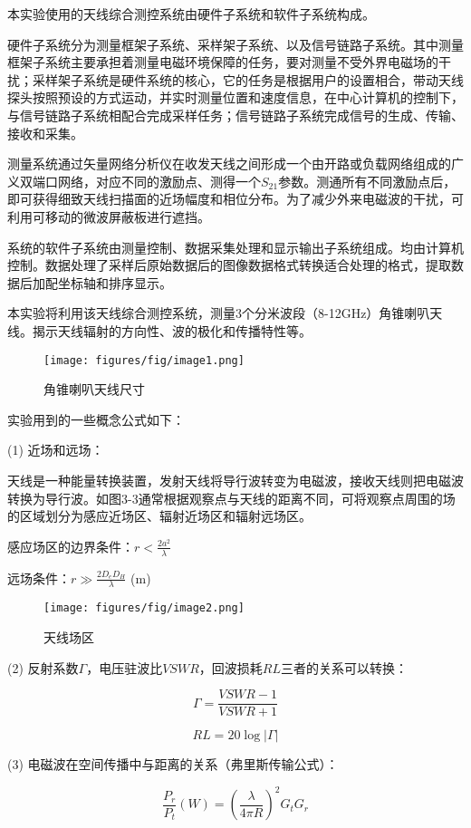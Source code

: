 \documentclass[12pt,hyperref,a4paper,UTF8]{ctexart}
\begin{document}
本实验使用的天线综合测控系统由硬件子系统和软件子系统构成。 

硬件子系统分为测量框架子系统、采样架子系统、以及信号链路子系统。其中测量框架子系统主要承担着测量电磁环境保障的任务，要对测量不受外界电磁场的干扰；采样架子系统是硬件系统的核心，它的任务是根据用户的设置相合，带动天线探头按照预设的方式运动，并实时测量位置和速度信息，在中心计算机的控制下，与信号链路子系统相配合完成采样任务；信号链路子系统完成信号的生成、传输、接收和采集。

测量系统通过矢量网络分析仪在收发天线之间形成一个由开路或负载网络组成的广义双端口网络，对应不同的激励点、测得一个$S_{21}$参数。测通所有不同激励点后，即可获得细致天线扫描面的近场幅度和相位分布。为了减少外来电磁波的干扰，可利用可移动的微波屏蔽板进行遮挡。

系统的软件子系统由测量控制、数据采集处理和显示输出子系统组成。均由计算机控制。数据处理了采样后原始数据后的图像数据格式转换适合处理的格式，提取数据后加配坐标轴和排序显示。

本实验将利用该天线综合测控系统，测量3个分米波段（8-12GHz）角锥喇叭天线。揭示天线辐射的方向性、波的极化和传播特性等。

\begin{figure}[h]
    \centering
    \texttt{[image: figures/fig/image1.png]}
    \caption{角锥喇叭天线尺寸}
\end{figure}

实验用到的一些概念公式如下：

(1) 近场和远场：

天线是一种能量转换装置，发射天线将导行波转变为电磁波，接收天线则把电磁波转换为导行波。如图3-3通常根据观察点与天线的距离不同，可将观察点周围的场的区域划分为感应近场区、辐射近场区和辐射远场区。

感应场区的边界条件：$r<\frac{2a^2}{\lambda}$

远场条件：$r\gg\frac{2D_eD_H}{\lambda}$ \quad (m)

\begin{figure}[h]
    \centering
    \texttt{[image: figures/fig/image2.png]}
    \caption{天线场区}
\end{figure}


(2) 反射系数$\Gamma$，电压驻波比$VSWR$，回波损耗$RL$三者的关系可以转换：

\[
\Gamma = \frac{VSWR-1}{VSWR+1}
\]

\[
RL = 20\log|\Gamma|
\]

(3) 电磁波在空间传播中与距离的关系（弗里斯传输公式）：

\[
\frac{P_r}{P_t}(W) = \left(\frac{\lambda}{4\pi R}\right)^2 G_t G_r
\]
\end{document}
